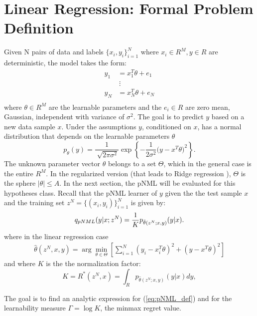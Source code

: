 \documentclass[conference,letterpaper]{IEEEtran}
\begin{document}
\section{Linear Regression: Formal Problem Definition} \label{sec:formal_problem_def}
Given N pairs of data and labels $\{x_i, y_i\}_{i=1}^{N}$ where $x_i \in R^M, y\in R$ are deterministic, the model takes the form:
\begin{equation}
\begin{split}
y_1&=x_1^T \theta + e_1 \\
   &\ \vdots \\
y_{N}&=x_{N}^T \theta + e_{N} \\
\end{split}
\end{equation}
where $\theta \in R^M$ are the learnable parameters and the $e_i \in R$ are zero mean, Gaussian, independent with variance of $\sigma^2$. 
The goal is to predict $y$ based on a new data sample $x$. 
Under the assumptions $y$, conditioned on $x$, has a normal distribution that depends on the learnable parameters $\theta$ 
\begin{equation}
p_{\theta}(y) 
=\frac{1}{\sqrt[]{2\pi\sigma^2}}\exp\left\{-\frac{1}{2\sigma^2}\big(y- x^T\theta \big)^2\right\}.
\end{equation}
The unknown parameter vector $\theta$ belongs to a set $\Theta$, which in the general case is the entire $R^M$. In the regularized version (that leads to Ridge regression \cite{ridgeregression}), $\Theta$ is the sphere $|\theta|\leq A$. 
In the next section, the pNML will be evaluated for this hypotheses class. 
Recall that the pNML learner of $y$ given the the test sample $x$ and the training set $z^N=\{(x_i,y_i)\}_{i=1}^{N}$ is given by:
\begin{equation} \label{eq:pNML_def}
q_{\mbox{\tiny{pNML}}}(y|x;z^N) = \frac{1}{K} p_{\hat{\theta}(z^N;x,y)}(y|x).
\end{equation}
where in the linear regression case 
\begin{align}
\hat{\theta}(z^N,x,y)= \arg\min_{\theta\in\Theta} \left[ \sum_{i=1}^N \left(y_i - x_i^T\theta \right)^2 + \left(y-x^T\theta\right)^2 \right]
\end{align}
and where  $K$ is the the normalization factor:
\begin{equation} \label{gamma}
K = R^*(z^N,x) = \int_R  p_{\hat{\theta}(z^N;x,y)}(y|x)dy,   
\end{equation}

The goal is to find an analytic expression for (\ref{eq:pNML_def}) and for the learnability measure $\Gamma = \log K$, the minmax regret value.
\end{document}
